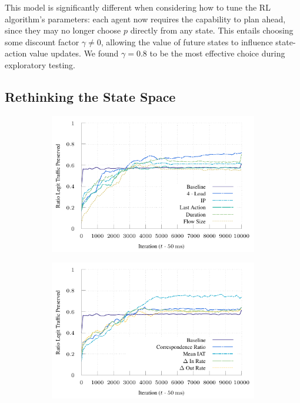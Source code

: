 \documentclass[conference, letterpaper, 10pt, times]{IEEEtran}
\begin{document}
This model is significantly different when considering how to tune the RL algorithm's parameters: each agent now requires the capability to plan ahead, since they may no longer choose $p$ directly from any state.
This entails choosing some discount factor $\gamma \ne 0$, allowing the value of future states to influence state-action value updates.
We found $\gamma = 0.8$ to be the most effective choice during exploratory testing.

\subsection{Rethinking the State Space}\label{sec:rethinking-the-state-space}

\begin{figure}
	\centering
	\begin{subfigure}{0.32\linewidth}
		\includegraphics[width=\linewidth]{../plots/ftprep-good}
	\end{subfigure}
	\begin{subfigure}{0.32\linewidth}
		\includegraphics[width=\linewidth]{../plots/ftprep-good-2}

\end{subfigure}
\end{figure}
\end{document}
